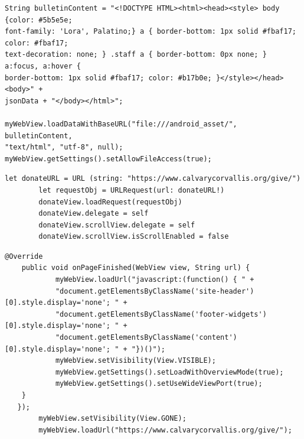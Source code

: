 \documentclass[letterpaper,10pt,draftclsnofoot,onecolumn,titlepage]{IEEEtran}
\begin{document}
\begin{lstlisting}[caption=Android Load into WebView]
String bulletinContent = "<!DOCTYPE HTML><html><head><style> body {color: #5b5e5e;
font-family: 'Lora', Palatino;} a { border-bottom: 1px solid #fbaf17; color: #fbaf17;
text-decoration: none; } .staff a { border-bottom: 0px none; } a:focus, a:hover {
border-bottom: 1px solid #fbaf17; color: #b17b0e; }</style></head><body>" +
jsonData + "</body></html>";

myWebView.loadDataWithBaseURL("file:///android_asset/", bulletinContent,
"text/html", "utf-8", null);
myWebView.getSettings().setAllowFileAccess(true);
\end{lstlisting}


\begin{lstlisting}[caption=iOS Donation Page]
 	let donateURL = URL (string: "https://www.calvarycorvallis.org/give/")
        let requestObj = URLRequest(url: donateURL!)
        donateView.loadRequest(requestObj)
        donateView.delegate = self
        donateView.scrollView.delegate = self
        donateView.scrollView.isScrollEnabled = false
\end{lstlisting}

\begin{lstlisting}[caption=Android Donation Page]
@Override
    public void onPageFinished(WebView view, String url) {
            myWebView.loadUrl("javascript:(function() { " +
            "document.getElementsByClassName('site-header')[0].style.display='none'; " +
            "document.getElementsByClassName('footer-widgets')[0].style.display='none'; " +
            "document.getElementsByClassName('content')[0].style.display='none'; " + "})()");
            myWebView.setVisibility(View.VISIBLE);
            myWebView.getSettings().setLoadWithOverviewMode(true);
            myWebView.getSettings().setUseWideViewPort(true);
   	}
   });
        myWebView.setVisibility(View.GONE);
        myWebView.loadUrl("https://www.calvarycorvallis.org/give/");
\end{lstlisting}
\end{document}
